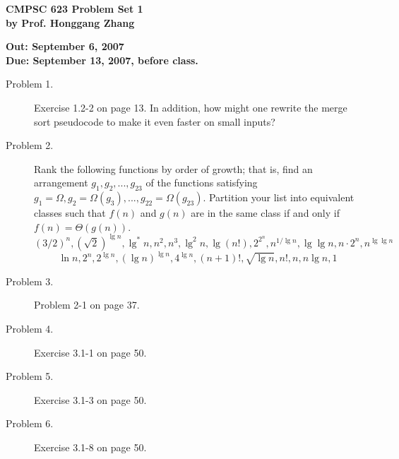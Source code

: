 \documentclass[11pt]{article}
\begin{document}

\begin{center}
{\bf CMPSC 623 Problem Set 1} \\
{\bf by Prof. Honggang Zhang} \\
\end{center}
\begin{center}
{\bf Out: September 6, 2007} \\
{\bf Due: September 13, 2007, before class.} \\

\end{center}


\begin{description}

\item[Problem 1.]
 Exercise 1.2-2 on page 13. In addition, how might one
rewrite the merge sort pseudocode to make it even faster on small
inputs?


\item[Problem 2.] Rank the following functions by order of growth; that is,
find an arrangement $g_1, g_2, ..., g_{23}$ of the functions
satisfying $g_1=\Omega, g_2=\Omega(g_3), ...,
g_{22}=\Omega(g_{23})$. Partition your list into equivalent
classes such that $f(n)$ and $g(n)$ are in the same class if and
only if $f(n)=\Theta(g(n))$.
$$(3/2)^n, (\sqrt{2})^{\lg n}, \lg^*n, n^2, n^3, \lg^2n,
\lg (n!), 2^{2^n}, n^{1/\lg n}, \lg \lg n, n\cdot 2^n, n^{\lg \lg
n}
$$
$$
\ln n, 2^n, 2^{\lg n}, (\lg n)^{\lg n}, 4^{\lg n}, (n+1)!,
\sqrt{\lg n}, n!,  n, n\lg n, 1
$$


\item[Problem 3.] Problem 2-1 on page 37.

\item[Problem 4.] Exercise 3.1-1 on page 50.

\item[Problem 5.] Exercise 3.1-3  on page 50.

\item[Problem 6.]Exercise 3.1-8  on page 50.




\end{description}
\end{document}
